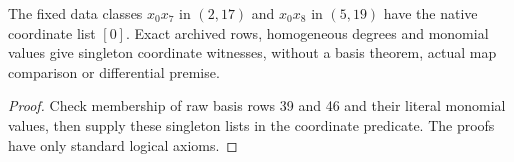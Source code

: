 \begin{lemma}
  \label{lem:lin-naturality-native-coordinates}
  \leanok
  The fixed data classes $x_0x_7$ in $(2,17)$ and $x_0x_8$ in $(5,19)$
  have the native coordinate list $[0]$. Exact archived rows, homogeneous
  degrees and monomial values give singleton coordinate witnesses, without
  a basis theorem, actual map comparison or differential premise.
\end{lemma}
\begin{proof}
  \leanok
  Check membership of raw basis rows 39 and 46 and their literal monomial
  values, then supply these singleton lists in the coordinate predicate.
  The proofs have only standard logical axioms.
\end{proof}


